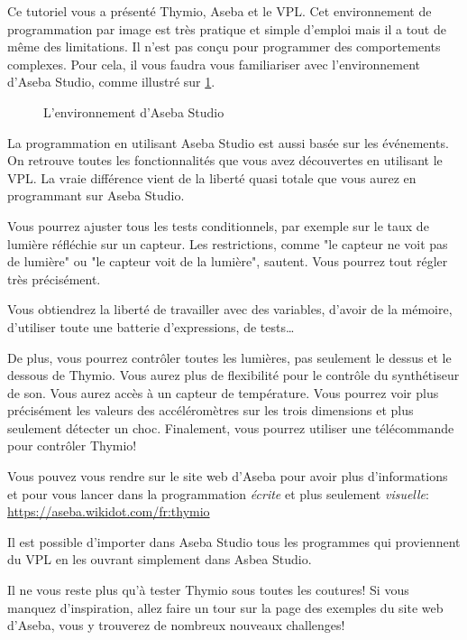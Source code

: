 
Ce tutoriel vous a présenté Thymio, Aseba et le VPL. Cet environnement de programmation par image est très pratique et simple d'emploi mais il a tout de même des limitations. Il n'est pas conçu pour programmer des comportements complexes. Pour cela, il vous faudra vous familiariser avec l'environnement d'Aseba Studio, comme illustré sur \cref{fig.Aseba_general}.

\begin{figure}[hbt]
\begin{center}
\caption{L'environnement d'Aseba Studio}\label{fig.Aseba_general}
\end{center}
\end{figure}

La programmation en utilisant Aseba Studio est aussi basée sur les événements. On retrouve toutes les fonctionnalités que vous avez découvertes en utilisant le VPL. La vraie différence vient de la liberté quasi totale que vous aurez en programmant sur Aseba Studio.

Vous pourrez ajuster tous les tests conditionnels, par exemple sur le taux de lumière réfléchie sur un capteur. Les restrictions, comme "le capteur ne voit pas de lumière" ou "le capteur voit de la lumière", sautent. Vous pourrez tout régler très précisément.

Vous obtiendrez la liberté de travailler avec des variables, d'avoir de la mémoire, d'utiliser toute une batterie d'expressions, de tests\ldots

De plus, vous pourrez contrôler toutes les lumières, pas seulement le dessus et le dessous de Thymio. Vous aurez plus de flexibilité pour le contrôle du synthétiseur de son. Vous aurez accès à un capteur de température. Vous pourrez voir plus précisément les valeurs des accéléromètres sur les trois dimensions et plus seulement détecter un choc. Finalement, vous pourrez utiliser une télécommande pour contrôler Thymio!

Vous pouvez vous rendre sur le site web d'Aseba pour avoir plus d'informations et pour vous lancer dans la programmation \textit{écrite} et plus seulement \textit{visuelle}: \url{https://aseba.wikidot.com/fr:thymio}

Il est possible d'importer dans Aseba Studio tous les programmes qui proviennent du VPL en les ouvrant simplement dans Asbea Studio.

Il ne vous reste plus qu'à tester Thymio sous toutes les coutures! Si vous manquez d'inspiration, allez faire un tour sur la page des exemples du site web d'Aseba, vous y trouverez de nombreux nouveaux challenges!

\begin{figure}[h]
\begin{center}
\end{center}
\end{figure}